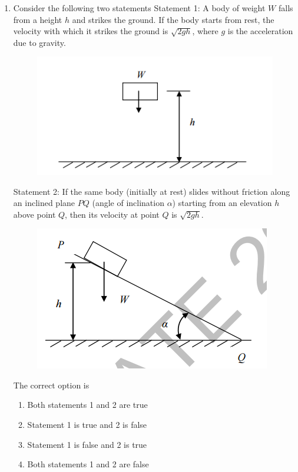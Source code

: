 \documentclass[a4paper,10pt]{article}
\begin{document}
\begin{enumerate}
    \hfill{}
    \begin{enumerate}[label=\Alph*)]
    \end{enumerate}

    \item Consider the following two statements
    Statement 1: A body of weight $W$ falls from a height $h$ and strikes the ground. If the body starts from rest, the velocity with which it strikes the ground is $\sqrt{2gh}$, where $g$ is the acceleration due to gravity.
    \begin{figure}[H] \centering \includegraphics[width=0.3\columnwidth]{q9_solid_1.png} \caption*{} \label{fig:q9_solid_1} \end{figure}
    Statement 2: If the same body (initially at rest) slides without friction along an inclined plane $PQ$ (angle of inclination $\alpha$) starting from an elevation $h$ above point $Q$, then its velocity at point $Q$ is $\sqrt{2gh}$.
    \begin{figure}[H] \centering \includegraphics[width=0.4\columnwidth]{q9_solid_2.png} \caption*{} \label{fig:q9_solid_2} \end{figure}
    The correct option is
    
    \hfill{}
    \begin{enumerate}[label=\Alph*)]
        \item Both statements 1 and 2 are true
        \item Statement 1 is true and 2 is false
        \item Statement 1 is false and 2 is true
        \item Both statements 1 and 2 are false
    \end{enumerate}


\end{enumerate}
\end{document}
